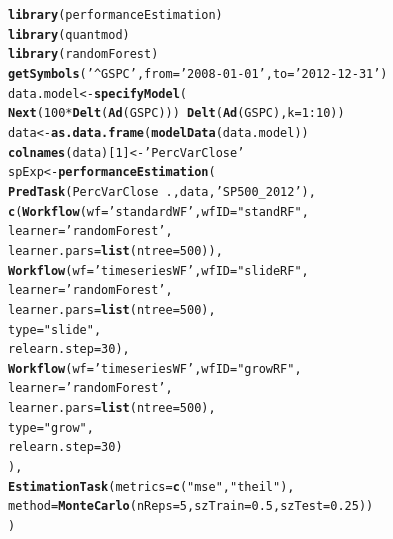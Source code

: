 \documentclass[10pt,a4paper]{article}\usepackage[]{graphicx}\usepackage[]{color}
\makeatletter
\newcommand{\hlnum}[1]{\textcolor[rgb]{0.686,0.059,0.569}{#1}}%
\newcommand{\hlstr}[1]{\textcolor[rgb]{0.192,0.494,0.8}{#1}}%
\newcommand{\hlopt}[1]{\textcolor[rgb]{0,0,0}{#1}}%
\newcommand{\hlstd}[1]{\textcolor[rgb]{0.345,0.345,0.345}{#1}}%
\newcommand{\hlkwb}[1]{\textcolor[rgb]{0.69,0.353,0.396}{#1}}%
\newcommand{\hlkwc}[1]{\textcolor[rgb]{0.333,0.667,0.333}{#1}}%
\newcommand{\hlkwd}[1]{\textcolor[rgb]{0.737,0.353,0.396}{\textbf{#1}}}%
\newenvironment{kframe}{%
 \def\at@end@of@kframe{}%
 \ifinner\ifhmode%
  \def\at@end@of@kframe{\end{minipage}}%
  \begin{minipage}{\columnwidth}%
 \fi\fi%
 \def\FrameCommand##1{\hskip\@totalleftmargin \hskip-\fboxsep
 \colorbox{shadecolor}{##1}\hskip-\fboxsep
     \hskip-\linewidth \hskip-\@totalleftmargin \hskip\columnwidth}%
 \MakeFramed {\advance\hsize-\width
   \@totalleftmargin\z@ \linewidth\hsize
   \@setminipage}}%
 {\par\unskip\endMakeFramed%
 \at@end@of@kframe}
\newenvironment{knitrout}{}{} %
\makeatother
\begin{document}
\begin{knitrout}\footnotesize
{}\color{fgcolor}\begin{kframe}
\begin{alltt}
\hlkwd{library}\hlstd{(performanceEstimation)}
\hlkwd{library}\hlstd{(quantmod)}
\hlkwd{library}\hlstd{(randomForest)}
\hlkwd{getSymbols}\hlstd{(}\hlstr{'^GSPC'}\hlstd{,}\hlkwc{from}\hlstd{=}\hlstr{'2008-01-01'}\hlstd{,}\hlkwc{to}\hlstd{=}\hlstr{'2012-12-31'}\hlstd{)}
\hlstd{data.model} \hlkwb{<-} \hlkwd{specifyModel}\hlstd{(}
  \hlkwd{Next}\hlstd{(}\hlnum{100}\hlopt{*}\hlkwd{Delt}\hlstd{(}\hlkwd{Ad}\hlstd{(GSPC)))} \hlopt{~} \hlkwd{Delt}\hlstd{(}\hlkwd{Ad}\hlstd{(GSPC),}\hlkwc{k}\hlstd{=}\hlnum{1}\hlopt{:}\hlnum{10}\hlstd{))}
\hlstd{data} \hlkwb{<-} \hlkwd{as.data.frame}\hlstd{(}\hlkwd{modelData}\hlstd{(data.model))}
\hlkwd{colnames}\hlstd{(data)[}\hlnum{1}\hlstd{]} \hlkwb{<-} \hlstr{'PercVarClose'}
\hlstd{spExp} \hlkwb{<-} \hlkwd{performanceEstimation}\hlstd{(}
  \hlkwd{PredTask}\hlstd{(PercVarClose} \hlopt{~} \hlstd{.,data,}\hlstr{'SP500_2012'}\hlstd{),}
  \hlkwd{c}\hlstd{(}\hlkwd{Workflow}\hlstd{(}\hlkwc{wf}\hlstd{=}\hlstr{'standardWF'}\hlstd{,}\hlkwc{wfID}\hlstd{=}\hlstr{"standRF"}\hlstd{,}
             \hlkwc{learner}\hlstd{=}\hlstr{'randomForest'}\hlstd{,}
             \hlkwc{learner.pars}\hlstd{=}\hlkwd{list}\hlstd{(}\hlkwc{ntree}\hlstd{=}\hlnum{500}\hlstd{)),}
    \hlkwd{Workflow}\hlstd{(}\hlkwc{wf}\hlstd{=}\hlstr{'timeseriesWF'}\hlstd{,}\hlkwc{wfID}\hlstd{=}\hlstr{"slideRF"}\hlstd{,}
             \hlkwc{learner}\hlstd{=}\hlstr{'randomForest'}\hlstd{,}
             \hlkwc{learner.pars}\hlstd{=}\hlkwd{list}\hlstd{(}\hlkwc{ntree}\hlstd{=}\hlnum{500}\hlstd{),}
             \hlkwc{type}\hlstd{=}\hlstr{"slide"}\hlstd{,}
             \hlkwc{relearn.step}\hlstd{=}\hlnum{30}\hlstd{),}
    \hlkwd{Workflow}\hlstd{(}\hlkwc{wf}\hlstd{=}\hlstr{'timeseriesWF'}\hlstd{,}\hlkwc{wfID}\hlstd{=}\hlstr{"growRF"}\hlstd{,}
             \hlkwc{learner}\hlstd{=}\hlstr{'randomForest'}\hlstd{,}
             \hlkwc{learner.pars}\hlstd{=}\hlkwd{list}\hlstd{(}\hlkwc{ntree}\hlstd{=}\hlnum{500}\hlstd{),}
             \hlkwc{type}\hlstd{=}\hlstr{"grow"}\hlstd{,}
             \hlkwc{relearn.step}\hlstd{=}\hlnum{30}\hlstd{)}
   \hlstd{),}
  \hlkwd{EstimationTask}\hlstd{(}\hlkwc{metrics}\hlstd{=}\hlkwd{c}\hlstd{(}\hlstr{"mse"}\hlstd{,}\hlstr{"theil"}\hlstd{),}
                 \hlkwc{method}\hlstd{=}\hlkwd{MonteCarlo}\hlstd{(}\hlkwc{nReps}\hlstd{=}\hlnum{5}\hlstd{,}\hlkwc{szTrain}\hlstd{=}\hlnum{0.5}\hlstd{,}\hlkwc{szTest}\hlstd{=}\hlnum{0.25}\hlstd{))}
  \hlstd{)}
\end{alltt}
\end{kframe}
\end{knitrout}
\end{document}
